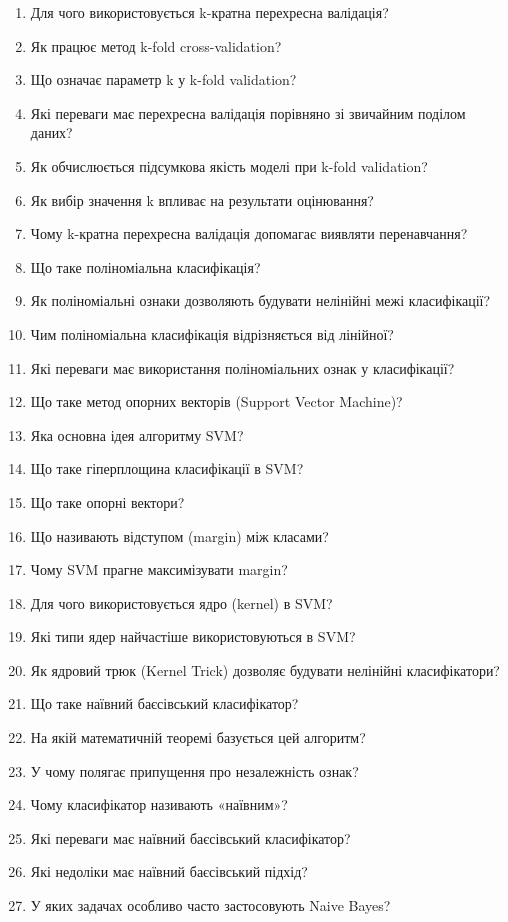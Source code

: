 \begin{enumerate}
\item Для чого використовується k-кратна перехресна валідація?
\item Як працює метод k-fold cross-validation?
\item Що означає параметр k у k-fold validation?
\item Які переваги має перехресна валідація порівняно зі звичайним поділом даних?
\item Як обчислюється підсумкова якість моделі при k-fold validation?
\item Як вибір значення k впливає на результати оцінювання?
\item Чому k-кратна перехресна валідація допомагає виявляти перенавчання?
\item Що таке поліноміальна класифікація?
\item Як поліноміальні ознаки дозволяють будувати нелінійні межі класифікації?
\item Чим поліноміальна класифікація відрізняється від лінійної?
\item Які переваги має використання поліноміальних ознак у класифікації?
\item Що таке метод опорних векторів (Support Vector Machine)?
\item Яка основна ідея алгоритму SVM?
\item Що таке гіперплощина класифікації в SVM?
\item Що таке опорні вектори?
\item Що називають відступом (margin) між класами?
\item Чому SVM прагне максимізувати margin?
\item Для чого використовується ядро (kernel) в SVM?
\item Які типи ядер найчастіше використовуються в SVM?
\item Як ядровий трюк (Kernel Trick) дозволяє будувати нелінійні класифікатори?
\item Що таке наївний баєсівський класифікатор?
\item На якій математичній теоремі базується цей алгоритм?
\item У чому полягає припущення про незалежність ознак?
\item Чому класифікатор називають «наївним»?
\item Які переваги має наївний баєсівський класифікатор?
\item Які недоліки має наївний баєсівський підхід?
\item У яких задачах особливо часто застосовують Naive Bayes?

\end{enumerate}
